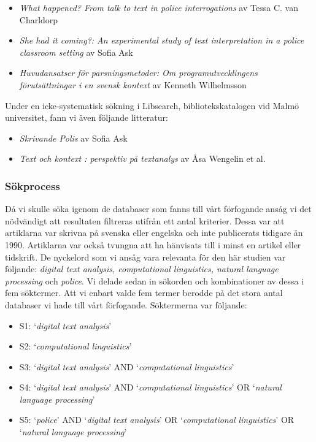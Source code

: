 \documentclass[swedish]{maucsthesis}
\begin{document}
\begin{itemize}
\item \textit{What happened? From talk to text in police interrogations} av
  Tessa C. van Charldorp
\item \textit{She had it coming?: An experimental study of text interpretation
    in a police classroom setting} av Sofia Ask
\item \textit{Huvudansatser för parsningsmetoder: Om programutvecklingens
    förutsättningar i en svensk kontext} av Kenneth Wilhelmsson
\end{itemize}

Under en icke-systematisk sökning i Libsearch, bibliotekskatalogen vid Malmö
universitet, fann vi även följande litteratur:

\begin{itemize}
\item \textit{Skrivande Polis} av Sofia Ask
\item \textit{Text och kontext : perspektiv på textanalys} av Åsa Wengelin et al.
\end{itemize}

\subsubsection{Sökprocess}

Då vi skulle söka igenom de databaser som fanns till vårt förfogande ansåg vi
det nödvändigt att resultaten filtreras utifrån ett antal kriterier. Dessa var
att artiklarna var skrivna på svenska eller engelska och inte publicerats
tidigare än 1990. Artiklarna var också tvungna att ha hänvisats till i minst en
artikel eller tidskrift. De nyckelord som vi ansåg vara relevanta för den här
studien var följande: \textit {digital text analysis, computational linguistics, natural
language processing} och \textit {police}. Vi delade sedan in sökorden och kombinationer av
dessa i fem söktermer. Att vi enbart valde fem termer berodde på det stora antal
databaser vi hade till vårt förfogande. Söktermerna var följande:

\begin{itemize}
\item S1: ‘\textit{digital text analysis}’
\item S2: ‘\textit{computational linguistics}’
\item S3: ‘\textit{digital text analysis}’ AND ‘\textit{computational
    linguistics}’
\item S4: ‘\textit{digital text analysis}’ AND ‘\textit{computational
    linguistics}’ OR ‘\textit{natural language processing}’
\item S5: ‘\textit{police}’ AND ‘\textit{digital text analysis}’ OR
  ‘\textit{computational linguistics}’ OR ‘\textit{natural language processing}’
\end{itemize}
\end{document}
